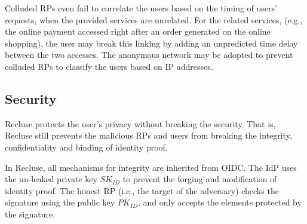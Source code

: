 Colluded RPs even fail to correlate the users based on the timing of users' requests, when the provided services are unrelated. For the related services, (e.g., the online payment accessed right after an order generated on the online shopping), the user may break this linking by adding an unpredicted time delay between the two accesses. The anonymous network may be adopted to prevent colluded RPs to classify the users based on IP addresses.
\begin{comment}
\begin{itemize}
  \item A \textbf{curious} RP fails to infer the user's unique identifier (i.e., UID) through $PPID$.
   \item A \textbf{colluded curious} RP fails to link a user between RPs.
  \item A \textbf{malicious} RP fails to make the UID leaked.
  \item The \textbf{colluded malicious RPs} fail to (actively) make the UID leaked.
  \item The \textbf{colluded malicious RPs} fail to actively trigger the generation of a same PPID or derivable PPIDs.
  \item The \textbf{colluded malicious RPs} fail to passively link a user between RPs.
\end{itemize}
\end{comment}

\subsection{Security}
\label{subsec:security}
Recluse protects the user's privacy without breaking the security. That is, Recluse still prevents the malicious RPs and users from breaking the integrity, confidentiality and binding of identity proof.

In Recluse, all mechanisms for integrity are inherited from OIDC. The IdP uses the un-leaked private key $SK_{ID}$ to prevent the forging and modification of identity proof. The honest RP (i.e., the target of the adversary) checks the signature using the public key $PK_{ID}$, and only accepts the elements protected by the signature.

